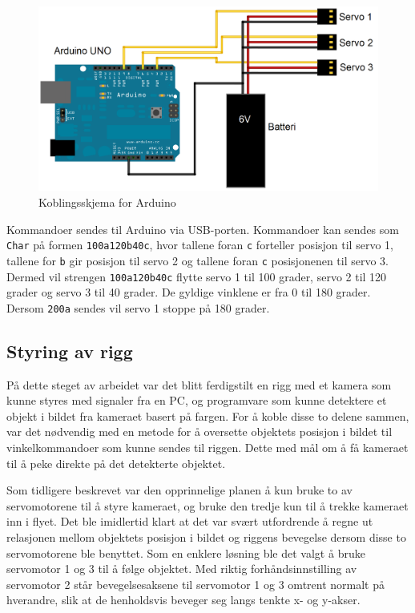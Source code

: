 \begin{figure}[h!]
	\centering
	\includegraphics[scale=0.25]{img/KoblingsskjemaArduino.png}
	\caption{Koblingsskjema for Arduino}
	\label{fig:ArduSkjem}
\end{figure}  

Kommandoer sendes til Arduino via USB-porten. Kommandoer kan sendes som \texttt{Char} på formen \texttt{100a120b40c}, hvor tallene foran \texttt{c} forteller posisjon til servo 1, tallene for \texttt{b} gir posisjon til servo 2 og tallene foran \texttt{c} posisjonenen til servo 3. Dermed vil strengen \texttt{100a120b40c} flytte servo 1 til 100 grader, servo 2 til 120 grader og servo 3 til 40 grader. De gyldige vinklene er fra 0 til 180 grader. Dersom \texttt{200a} sendes vil servo 1 stoppe på 180 grader. 

\subsection{Styring av rigg}

På dette steget av arbeidet var det blitt ferdigstilt en rigg med et kamera som kunne styres med signaler fra en PC, og programvare som kunne detektere et objekt i bildet fra kameraet basert på fargen. For å koble disse to delene sammen, var det nødvendig med en metode for å oversette objektets posisjon i bildet til vinkelkommandoer som kunne sendes til riggen. Dette med mål om å få kameraet til å peke direkte på det detekterte objektet.

Som tidligere beskrevet var den opprinnelige planen å kun bruke to av servomotorene til å styre kameraet, og bruke den tredje kun til å trekke kameraet inn i flyet. Det ble imidlertid klart at det var svært utfordrende å regne ut relasjonen mellom objektets posisjon i bildet og riggens bevegelse dersom disse to servomotorene ble benyttet. Som en enklere løsning ble det valgt å bruke servomotor 1 og 3 til å følge objektet. Med riktig forhåndsinnstilling av servomotor 2 står bevegelsesaksene til servomotor 1 og 3 omtrent normalt på hverandre, slik at de henholdsvis beveger seg langs tenkte x- og y-akser.

